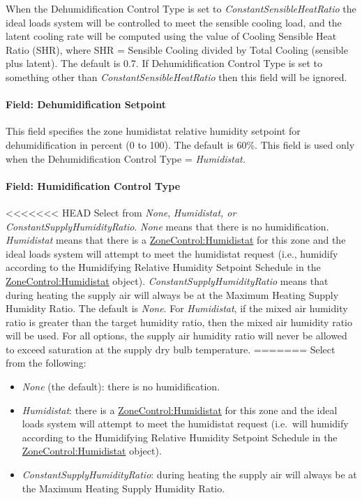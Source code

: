 When the Dehumidification Control Type is set to \emph{ConstantSensibleHeatRatio} the ideal loads system will be controlled to meet the sensible cooling load, and the latent cooling rate will be computed using the value of Cooling Sensible Heat Ratio (SHR), where SHR = Sensible Cooling divided by Total Cooling (sensible plus latent). The default is 0.7. If Dehumidification Control Type is set to something other than \emph{ConstantSensibleHeatRatio} then this field will be ignored.

\paragraph{Field: Dehumidification Setpoint}\label{field-dehumidification-setpoint}

This field specifies the zone humidistat relative humidity setpoint for dehumidification in percent (0 to 100). The default is 60\%. This field is used only when the Dehumidification Control Type = \emph{Humidistat.}

\paragraph{Field: Humidification Control Type}\label{field-humidification-control-type}

<<<<<<< HEAD
Select from \emph{None}, \emph{Humidistat, or ConstantSupplyHumidityRatio}. \emph{None} means that there is no humidification. \emph{Humidistat} means that there is a \hyperref[zonecontrolhumidistat]{ZoneControl:Humidistat} for this zone and the ideal loads system will attempt to meet the humidistat request (i.e., humidify according to the Humidifying Relative Humidity Setpoint Schedule in the \hyperref[zonecontrolhumidistat]{ZoneControl:Humidistat} object). \emph{ConstantSupplyHumidityRatio} means that during heating the supply air will always be at the Maximum Heating Supply Humidity Ratio. The default is \emph{None}. For \emph{Humidistat}, if the mixed air humidity ratio is greater than the target humidity ratio, then the mixed air humidity ratio will be used. For all options, the supply air humidity ratio will never be allowed to exceed saturation at the supply dry bulb temperature.
=======
Select from the following:

\begin{itemize}
\item
  \emph{None} (the default): there is no humidification.
\item
  \emph{Humidistat}: there is a \hyperref[zonecontrolhumidistat]{ZoneControl:Humidistat} for this zone and the ideal loads system will attempt to meet the humidistat request (i.e.~will humidify according to the Humidifying Relative Humidity Setpoint Schedule in the \hyperref[zonecontrolhumidistat]{ZoneControl:Humidistat} object).
\item
  \emph{ConstantSupplyHumidityRatio}: during heating the supply air will always be at the Maximum Heating Supply Humidity Ratio.
\end{itemize}

